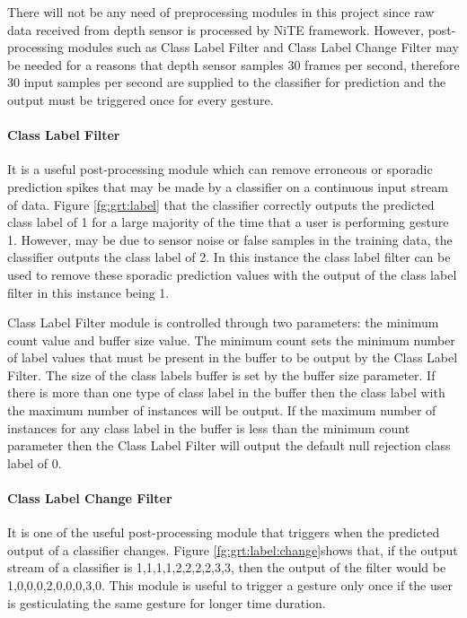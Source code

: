 There will not be any need of preprocessing modules in this project since raw data received from depth sensor is processed by NiTE framework. However, post-processing modules such as Class Label Filter and Class Label Change Filter may be needed for a reasons that depth sensor samples 30 frames per second, therefore 30 input samples per second are supplied to the classifier for prediction and the output must be triggered once for every gesture. 



\paragraph*{Class Label Filter} It is a useful post-processing module which can remove erroneous or sporadic prediction spikes that may be made by a classifier on a continuous input stream of data. Figure \ref{fg:grt:label} that the classifier correctly outputs the predicted class label of 1 for a large majority of the time that a user is performing gesture 1. However, may be due to sensor noise or false samples in the training data, the classifier outputs the class label of 2. In this instance the class label filter can be used to remove these sporadic prediction values with the output of the class label filter in this instance being 1. 

Class Label Filter module is controlled through two parameters: the minimum count value and buffer size value. The minimum count sets the minimum number of label values that must be present in the buffer to be output by the Class Label Filter. The size of the class labels buffer is set by the buffer size parameter. If there is more than one type of class label in the buffer then the class label with the maximum number of instances will be output. If the maximum number of instances for any class label in the buffer is less than the minimum count parameter then the Class Label Filter will output the default null rejection class label of 0.



\paragraph*{Class Label Change Filter} It is one of the useful post-processing module that triggers when the predicted output of a classifier changes. Figure \ref{fg:grt:label:change}shows that, if the output stream of a classifier is {1,1,1,1,2,2,2,2,3,3}, then the output of the filter would be {1,0,0,0,2,0,0,0,3,0}. This module is useful to trigger a gesture only once if the user is gesticulating the same gesture for longer time duration. 

